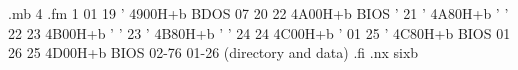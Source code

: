 .mb 4
.fm 1
  01         19      '         4900H+b              BDOS
  07         20      22        4A00H+b              BIOS
  '          21      '         4A80H+b                '
  '          22      23        4B00H+b                '
  '          23      '         4B80H+b                '
  '          24      24        4C00H+b                '
  01         25      '         4C80H+b              BIOS
  01         26      25        4D00H+b              BIOS
02-76      01-26                            (directory and data)
.fi
.nx sixb

















